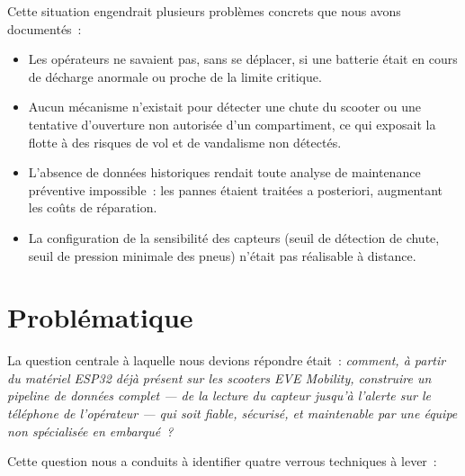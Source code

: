 \documentclass[12pt, a4paper]{report}
\begin{document}
Cette situation engendrait plusieurs problèmes concrets que nous avons documentés~:

\begin{itemize}
  \item Les opérateurs ne savaient pas, sans se déplacer, si une batterie était en
        cours de décharge anormale ou proche de la limite critique.
  \item Aucun mécanisme n'existait pour détecter une chute du scooter ou une
        tentative d'ouverture non autorisée d'un compartiment, ce qui exposait la
        flotte à des risques de vol et de vandalisme non détectés.
  \item L'absence de données historiques rendait toute analyse de maintenance
        préventive impossible~: les pannes étaient traitées a posteriori,
        augmentant les coûts de réparation.
  \item La configuration de la sensibilité des capteurs (seuil de détection de
        chute, seuil de pression minimale des pneus) n'était pas réalisable à distance.
\end{itemize}

\section{Problématique}

La question centrale à laquelle nous devions répondre était~: \textit{comment,
à partir du matériel ESP32 déjà présent sur les scooters EVE Mobility, construire un
pipeline de données complet --- de la lecture du capteur jusqu'à l'alerte sur le
téléphone de l'opérateur --- qui soit fiable, sécurisé, et maintenable par une équipe
non spécialisée en embarqué~?}

Cette question nous a conduits à identifier quatre verrous techniques à lever~:
\end{document}
